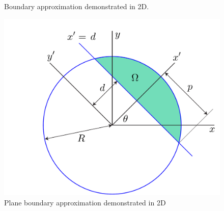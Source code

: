 \begin{figure}[ht]
{\label{fig:subfigure6}}

\caption{Boundary approximation demonstrated in 2D.}
\label{fig:figure3}
\end{figure}

\begin{figure}[ht!]
	\centering
		\includegraphics[scale=0.3]{media/om/window.pdf}
	\caption{Plane boundary approximation demonstrated in 2D}
	\label{fig:quad}
\end{figure}

